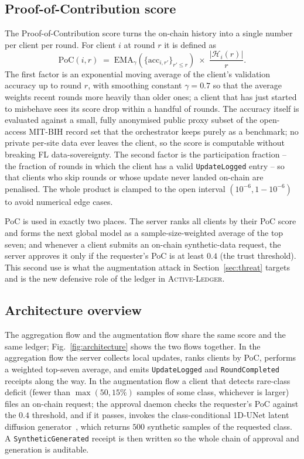 \documentclass[runningheads]{llncs}
\newcommand{\actledger}{\textsc{Active-Ledger}\xspace}
\begin{document}
\subsection{Proof-of-Contribution score}
\label{subsec:poc}
The Proof-of-Contribution score turns the on-chain history into a
single number per client per round. For client $i$ at round $r$ it
is defined as
\begin{equation}
\mathrm{PoC}(i, r) \;=\;
\mathrm{EMA}_{\gamma}\!\left(\{\mathrm{acc}_{i, r'}\}_{r' \le r}\right)
\;\times\;
\frac{\lvert\mathcal{H}_i(r)\rvert}{r}.
\label{eq:poc}
\end{equation}
The first factor is an exponential moving average of the client's
validation accuracy up to round $r$, with smoothing constant
$\gamma = 0.7$ so that the average weights recent rounds more
heavily than older ones; a client that has just started to
misbehave sees its score drop within a handful of rounds. The
accuracy itself is evaluated against a small, fully anonymised
public proxy subset of the open-access MIT-BIH record set that the
orchestrator keeps purely as a benchmark; no private per-site data
ever leaves the client, so the score is computable without breaking
FL data-sovereignty. The second factor is the participation fraction
-- the fraction of rounds in which the client has a valid
\texttt{UpdateLogged} entry -- so that clients who skip rounds or
whose update never landed on-chain are penalised. The whole product
is clamped to the open interval $(10^{-6}, 1-10^{-6})$ to avoid
numerical edge cases.

PoC is used in exactly two places. The server ranks all clients by
their PoC score and forms the next global model as a
sample-size-weighted average of the top seven; and whenever a client
submits an on-chain synthetic-data request, the server approves it
only if the requester's PoC is at least $0.4$ (the trust threshold).
This second use is what the augmentation attack in
Section~\ref{sec:threat} targets and is the new defensive role of
the ledger in \actledger.

\subsection{Architecture overview}
The aggregation flow and the augmentation flow share the same score
and the same ledger; Fig.~\ref{fig:architecture} shows the two flows
together. In the aggregation flow the server collects local updates,
ranks clients by PoC, performs a weighted top-seven average, and
emits \texttt{UpdateLogged} and \texttt{RoundCompleted} receipts
along the way. In the augmentation flow a client that detects
rare-class deficit (fewer than $\max(50, 15\%)$ samples of some
class, whichever is larger) files an on-chain request; the approval
daemon checks the requester's PoC against the $0.4$ threshold, and
if it passes, invokes the class-conditional 1D-UNet latent diffusion
generator~\cite{ho2020ddpm,rombach2022ldm}, which returns $500$
synthetic samples of the requested class. A
\texttt{SyntheticGenerated} receipt is then written so the whole
chain of approval and generation is auditable.
\end{document}
